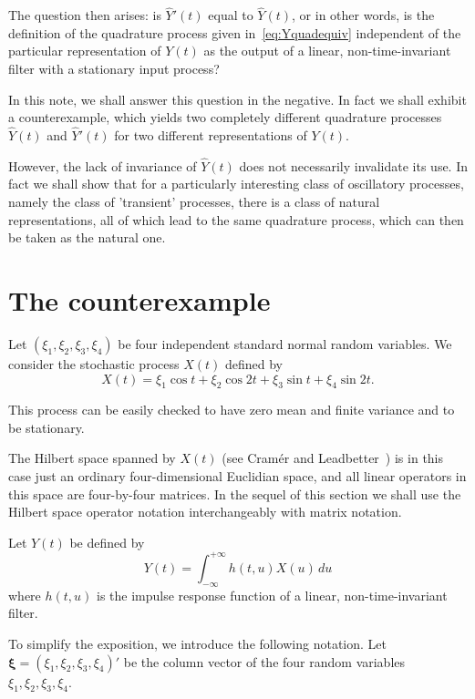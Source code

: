 \documentclass{article}
\begin{document}
The question then arises: is $\hat{Y}'(t)$ equal to $\hat{Y}(t)$, or in other words, is the definition of the quadrature process given in~\eqref{eq:Yquadequiv} independent of the particular representation of $Y(t)$ as the output of a linear, non-time-invariant filter with a stationary input process?

In this note, we shall answer this question in the negative. In fact we shall exhibit a counterexample, which yields two completely different quadrature processes $\hat{Y}(t)$ and $\hat{Y}'(t)$ for two different representations of $Y(t)$.

However, the lack of invariance of $\hat{Y}(t)$ does not necessarily invalidate its use. In fact we shall show that for a particularly interesting class of oscillatory processes, namely the class of 'transient' processes, there is a class of natural representations, all of which lead to the same quadrature process, which can then be taken as the natural one.

\section*{The counterexample}

Let $(\xi_1, \xi_2, \xi_3, \xi_4)$ be four independent standard normal random variables. We consider the stochastic process $X(t)$ defined by
\begin{equation}
X(t) = \xi_1 \cos t + \xi_2 \cos 2t + \xi_3 \sin t + \xi_4 \sin 2t.
\label{eq:Xcounter}
\end{equation}

This process can be easily checked to have zero mean and finite variance and to be stationary.

The Hilbert space spanned by $X(t)$ (see Cramér and Leadbetter~\cite[ p. 105]{cramerleadbetter}) is in this case just an ordinary four-dimensional Euclidian space, and all linear operators in this space are four-by-four matrices. In the sequel of this section we shall use the Hilbert space operator notation interchangeably with matrix notation.

Let $Y(t)$ be defined by
\begin{equation}
Y(t) = \int_{-\infty}^{+\infty} h(t, u) X(u)\, du
\label{eq:Ycounter}
\end{equation}
where $h(t, u)$ is the impulse response function of a linear, non-time-invariant filter.

To simplify the exposition, we introduce the following notation. Let $\boldsymbol{\xi} = (\xi_1, \xi_2, \xi_3, \xi_4)'$ be the column vector of the four random variables $\xi_1, \xi_2, \xi_3, \xi_4$.
\end{document}
